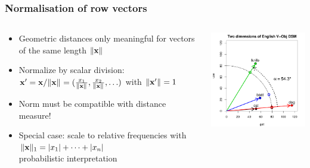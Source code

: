 \documentclass[t]{beamer} %
\begin{document}
\begin{frame}[c]
  \frametitle{Normalisation of row vectors}
  
  \begin{columns}[c]
    \begin{column}{5.5cm}
      \begin{itemize}
      \item Geometric distances only meaningful for vectors of the same length $\norm{\vx}$
      \item<2-> Normalize by scalar division:\\
        \(
        \vx' = \vx / \norm{\vx} = (\tfrac{x_1}{\norm{\vx}}, \tfrac{x_2}{\norm{\vx}}, \ldots)
        \)
        with $\norm{\vx'} = 1$
      \item<2-> Norm must be compatible with distance measure!
      \item<3-> Special case: scale to relative frequencies with\\
        \hspace{1em} $\norm[1]{\vx} = \abs{x_1} + \dots + \abs{x_n}$\\
        \so probabilistic interpretation
      \end{itemize}
    \end{column}
    \begin{column}{6cm}
      \includegraphics[width=6cm]{img/hieroglyph_2d_5}
    \end{column}
  \end{columns}
\end{frame}
\end{document}

